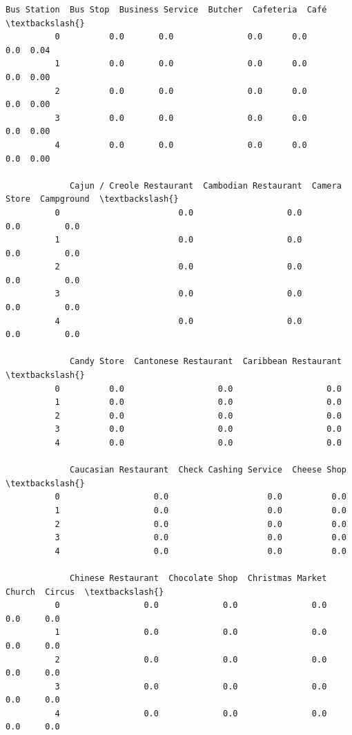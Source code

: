 \documentclass[11pt]{article}
\begin{document}
\begin{Verbatim}[commandchars=\\\{\}]
             Bus Station  Bus Stop  Business Service  Butcher  Cafeteria  Café  \textbackslash{}
          0          0.0       0.0               0.0      0.0        0.0  0.04   
          1          0.0       0.0               0.0      0.0        0.0  0.00   
          2          0.0       0.0               0.0      0.0        0.0  0.00   
          3          0.0       0.0               0.0      0.0        0.0  0.00   
          4          0.0       0.0               0.0      0.0        0.0  0.00   
          
             Cajun / Creole Restaurant  Cambodian Restaurant  Camera Store  Campground  \textbackslash{}
          0                        0.0                   0.0           0.0         0.0   
          1                        0.0                   0.0           0.0         0.0   
          2                        0.0                   0.0           0.0         0.0   
          3                        0.0                   0.0           0.0         0.0   
          4                        0.0                   0.0           0.0         0.0   
          
             Candy Store  Cantonese Restaurant  Caribbean Restaurant  \textbackslash{}
          0          0.0                   0.0                   0.0   
          1          0.0                   0.0                   0.0   
          2          0.0                   0.0                   0.0   
          3          0.0                   0.0                   0.0   
          4          0.0                   0.0                   0.0   
          
             Caucasian Restaurant  Check Cashing Service  Cheese Shop  \textbackslash{}
          0                   0.0                    0.0          0.0   
          1                   0.0                    0.0          0.0   
          2                   0.0                    0.0          0.0   
          3                   0.0                    0.0          0.0   
          4                   0.0                    0.0          0.0   
          
             Chinese Restaurant  Chocolate Shop  Christmas Market  Church  Circus  \textbackslash{}
          0                 0.0             0.0               0.0     0.0     0.0   
          1                 0.0             0.0               0.0     0.0     0.0   
          2                 0.0             0.0               0.0     0.0     0.0   
          3                 0.0             0.0               0.0     0.0     0.0   
          4                 0.0             0.0               0.0     0.0     0.0   
          

\end{Verbatim}
\end{document}
